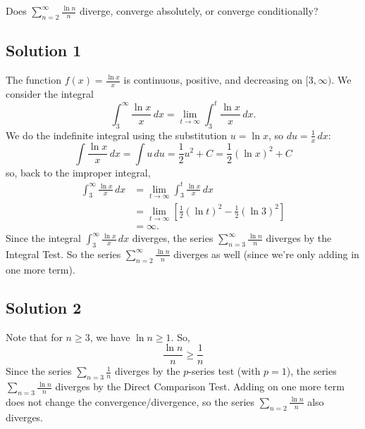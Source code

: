 \documentclass{article}
\begin{document}
\noindent
Does $\displaystyle \sum_{n=2}^\infty \frac{\ln n}{n}$
diverge, converge absolutely, or converge conditionally?


\subsection*{Solution 1}

The function $f(x)=\frac{\ln x}{x}$ is continuous, positive, and decreasing on $[3,\infty)$. We consider the integral
\[ \int_3^\infty \frac{\ln x}{x}\,dx = \lim_{t \to \infty} \int_3^t \frac{\ln x}{x}\,dx.\]
We do the indefinite integral using the substitution $u= \ln x$, so $du = \frac1x\,dx$:
\[
\int \frac{\ln x}{x}\,dx
= \int u\,du = \frac12u^2 + C = \frac12(\ln x)^2 + C
\]
so, back to the improper integral,
\begin{align*}
\int_3^\infty \frac{\ln x}{x}\,dx 
&= \lim_{t \to \infty} \int_3^t \frac{\ln x}{x}\,dx\\
&= \lim_{t \to \infty}\left[  \frac12(\ln t)^2 -  \frac12(\ln 3)^2 \right] \\
&= \infty.
\end{align*}
Since the integral $\displaystyle \int_3^\infty \frac{\ln x}{x}\,dx$ diverges, the series  $\displaystyle \sum_{n=3}^\infty \frac{\ln n}{n}$ diverges by the Integral Test. So the series $\displaystyle \sum_{n=2}^\infty \frac{\ln n}{n}$ diverges as well (since we're only adding in one more term).

\subsection*{Solution 2}

Note that for $n \geq 3$, we have $\ln n \geq 1$. So,
\[ \frac{\ln n}{n} \geq \frac{1}{n}\]
Since the series $\displaystyle \sum_{n=3} \frac1n$ diverges by the $p$-series test (with $p=1$), the series 
 $\displaystyle \sum_{n=3} \frac{\ln n}n$ diverges by the Direct Comparison Test. Adding on one more term does not change the convergence/divergence, so the series  $\displaystyle \sum_{n=2} \frac{\ln n}n$ also diverges.
\end{document}
